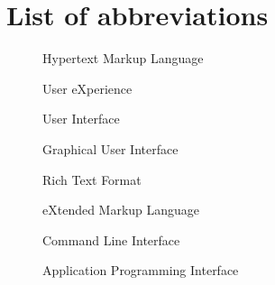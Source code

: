 \chapter*{List of abbreviations}

\begin{multicols}{2}
    \raggedright
    \begin{description}
        \item [] Hypertext Markup Language
        \item [] User eXperience
        \item [] User Interface
        \item [] Graphical User Interface
        \item [] Rich Text Format
        \item [] eXtended Markup Language
        \item [] Command Line Interface
        \item [] Application Programming Interface
    \end{description}
\end{multicols}

